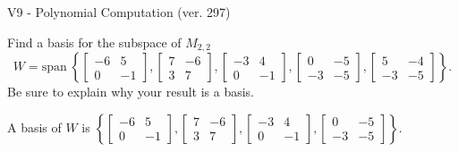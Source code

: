 \begin{exercise}
  \begin{exerciseTitle}V9 - Polynomial Computation (ver. 297)\end{exerciseTitle}
  \begin{exerciseStatement}
    Find a basis for the subspace of \(M_{2,2}\) 
\[W=\mathrm{span}\ \left\{\left[\begin{array}{cc}
-6 & 5 \\
0 & -1
\end{array}\right] , \left[\begin{array}{cc}
7 & -6 \\
3 & 7
\end{array}\right] , \left[\begin{array}{cc}
-3 & 4 \\
0 & -1
\end{array}\right] , \left[\begin{array}{cc}
0 & -5 \\
-3 & -5
\end{array}\right] , \left[\begin{array}{cc}
5 & -4 \\
-3 & -5
\end{array}\right]\right\}.\]
 Be sure to explain why your result is a basis.


  \end{exerciseStatement}
  \begin{exerciseAnswer}
   A basis of \(W\) is  \(\left\{\left[\begin{array}{cc}
-6 & 5 \\
0 & -1
\end{array}\right] , \left[\begin{array}{cc}
7 & -6 \\
3 & 7
\end{array}\right] , \left[\begin{array}{cc}
-3 & 4 \\
0 & -1
\end{array}\right] , \left[\begin{array}{cc}
0 & -5 \\
-3 & -5
\end{array}\right]\right\}\).
  


  \end{exerciseAnswer}
\end{exercise}